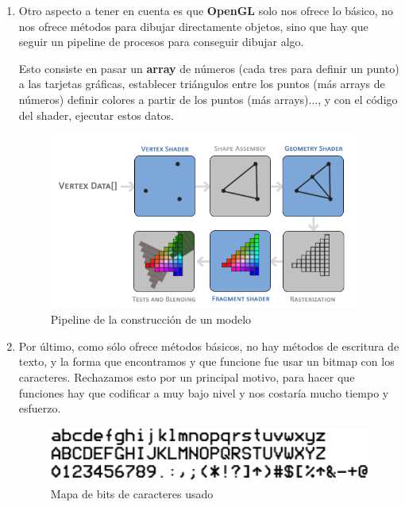 \begin{enumerate}
    \item Otro aspecto a tener en cuenta es que \textbf{OpenGL} solo nos ofrece lo básico, no nos ofrece métodos para dibujar 
    directamente objetos, sino que hay que seguir un pipeline de procesos para conseguir dibujar algo.
    \newline
    \begin{flushleft}
    Esto consiste en pasar un \textbf{array} de números (cada tres para definir un punto) 
    a las tarjetas gráficas, establecer triángulos entre los puntos (más arrays de números) 
    definir colores a partir de los puntos (más arrays)..., y con el código del shader, ejecutar 
    estos datos.
    \begin{figure}
        \centering
        \includegraphics[width=4in]{figures/pipeline.png}
        \caption{Pipeline de la construcción de un modelo}
    \end{figure}
    \end{flushleft}
    \newpage
    \item Por último, como sólo ofrece métodos básicos, no hay métodos de escritura de texto, y la forma que 
    encontramos y que funcione fue usar un bitmap con los caracteres. Rechazamos esto por un principal motivo, para hacer que funciones hay que codificar a muy bajo nivel y 
    nos costaría mucho tiempo y esfuerzo.
    \begin{figure}
        \centering
        \includegraphics[width=5in]{figures/bitmap-font.png}
        \caption{Mapa de bits de caracteres usado}
    \end{figure}
\end{enumerate}
 

\newpage
